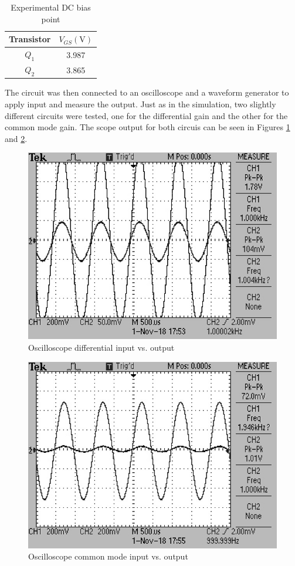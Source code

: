 \documentclass[11pt]{article}
\begin{document}
	\begin{table}[H]
		\centering
		\caption{Experimental DC bias point}
		\label{table:DC_exp}
		\begin{tabular}{|c|c|}
			\hline
			\textbf{Transistor} & $V_{GS} (\si\volt)$\\
			\hline
			$Q_1$ & 3.987\\
			$Q_2$ & 3.865\\
			\hline
		\end{tabular}
	\end{table}

	The circuit was then connected to an oscilloscope and a waveform generator
	to apply input and measure the output. Just as in the simulation, two slightly
	different circuits were tested, one for the differential gain and the other 
	for the common mode gain. The scope output for both circuis can be seen in
	Figures \ref{fig:diff_gain_scope} and \ref{fig:common_gain_scope}.

	\begin{figure}[H]
		\centering
		\includegraphics[width=4.0 in]{diff_gain.jpg}
		\caption{Oscilloscope differential input vs. output}
		\label{fig:diff_gain_scope}
	\end{figure}

	\begin{figure}[H]
		\centering
		\includegraphics[width=4.0 in]{common_gain.jpg}
		\caption{Oscilloscope common mode input vs. output}
		\label{fig:common_gain_scope}
	\end{figure}
\end{document}
